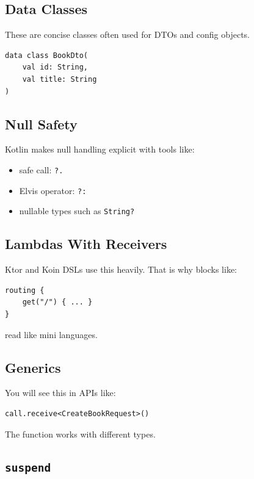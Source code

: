\documentclass[11pt,a4paper]{article}
\begin{document}
\subsection{Data Classes}

These are concise classes often used for DTOs and config objects.

\begin{lstlisting}[style=kazekotlin]
data class BookDto(
    val id: String,
    val title: String
)
\end{lstlisting}

\subsection{Null Safety}

Kotlin makes null handling explicit with tools like:
\begin{itemize}
    \item safe call: \texttt{?.}
    \item Elvis operator: \texttt{?:}
    \item nullable types such as \texttt{String?}
\end{itemize}

\subsection{Lambdas With Receivers}

Ktor and Koin DSLs use this heavily. That is why blocks like:

\begin{lstlisting}[style=kazekotlin]
routing {
    get("/") { ... }
}
\end{lstlisting}

read like mini languages.

\subsection{Generics}

You will see this in APIs like:

\begin{lstlisting}[style=kazekotlin]
call.receive<CreateBookRequest>()
\end{lstlisting}

The function works with different types.

\subsection{\texttt{suspend}}
\end{document}
